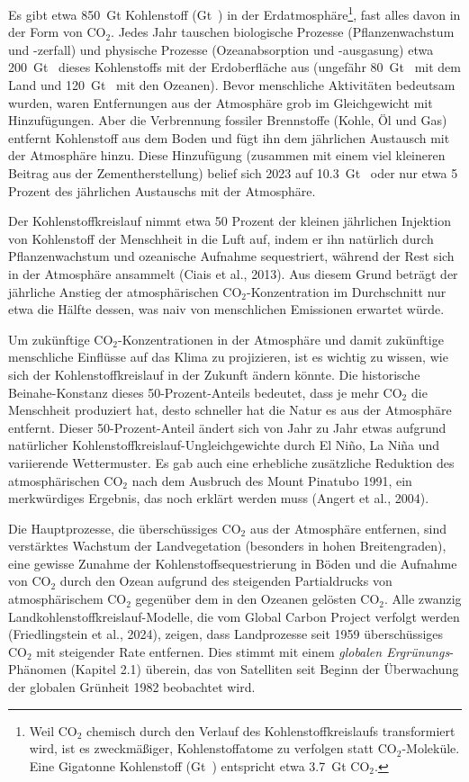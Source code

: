 \documentclass[12pt,paper=a4,DIV=12,parskip=never,chapterprefix=false,headings=standardclasses]{scrreprt}
\begin{document}
Es gibt etwa \SI{850}{\giga\tonne} Kohlenstoff (\si{\giga\tonne{}}) in der Erdatmosphäre\footnote{Weil CO$_2$ chemisch durch den Verlauf des Kohlenstoffkreislaufs transformiert wird, ist es zweckmäßiger, Kohlenstoffatome zu verfolgen statt CO$_2$-Moleküle. Eine Gigatonne Kohlenstoff (\si{\giga\tonne{}}) entspricht etwa \SI{3.7}{\giga\tonne} CO$_2$.}, fast alles davon in der Form von CO$_2$. Jedes Jahr tauschen biologische Prozesse (Pflanzenwachstum und -zerfall) und physische Prozesse (Ozeanabsorption und -ausgasung) etwa \SI{200}{\giga\tonne{}} dieses Kohlenstoffs mit der Erdoberfläche aus (ungefähr \SI{80}{\giga\tonne{}} mit dem Land und \SI{120}{\giga\tonne{}} mit den Ozeanen). Bevor menschliche Aktivitäten bedeutsam wurden, waren Entfernungen aus der Atmosphäre grob im Gleichgewicht mit Hinzufügungen. Aber die Verbrennung fossiler Brennstoffe (Kohle, Öl und Gas) entfernt Kohlenstoff aus dem Boden und fügt ihn dem jährlichen Austausch mit der Atmosphäre hinzu. Diese Hinzufügung (zusammen mit einem viel kleineren Beitrag aus der Zementherstellung) belief sich 2023 auf \SI{10.3}{\giga\tonne{}} oder nur etwa 5 Prozent des jährlichen Austauschs mit der Atmosphäre.

Der Kohlenstoffkreislauf nimmt etwa 50 Prozent der kleinen jährlichen Injektion von Kohlenstoff der Menschheit in die Luft auf, indem er ihn natürlich durch Pflanzenwachstum und ozeanische Aufnahme sequestriert, während der Rest sich in der Atmosphäre ansammelt (Ciais et al., 2013). Aus diesem Grund beträgt der jährliche Anstieg der atmosphärischen CO$_2$-Konzentration im Durchschnitt nur etwa die Hälfte dessen, was naiv von menschlichen Emissionen erwartet würde.

Um zukünftige CO$_2$-Konzentrationen in der Atmosphäre und damit zukünftige menschliche Einflüsse auf das Klima zu projizieren, ist es wichtig zu wissen, wie sich der Kohlenstoffkreislauf in der Zukunft ändern könnte. Die historische Beinahe-Konstanz dieses 50-Prozent-Anteils bedeutet, dass je mehr CO$_2$ die Menschheit produziert hat, desto schneller hat die Natur es aus der Atmosphäre entfernt. Dieser 50-Prozent-Anteil ändert sich von Jahr zu Jahr etwas aufgrund natürlicher Kohlenstoffkreislauf-Ungleichgewichte durch El Ni\~no, La Ni\~na und variierende Wettermuster. Es gab auch eine erhebliche zusätzliche Reduktion des atmosphärischen CO$_2$ nach dem Ausbruch des Mount Pinatubo 1991, ein merkwürdiges Ergebnis, das noch erklärt werden muss (Angert et al., 2004).

Die Hauptprozesse, die überschüssiges CO$_2$ aus der Atmosphäre entfernen, sind verstärktes Wachstum der Landvegetation (besonders in hohen Breitengraden), eine gewisse Zunahme der Kohlenstoffsequestrierung in Böden und die Aufnahme von CO$_2$ durch den Ozean aufgrund des steigenden Partialdrucks von atmosphärischem CO$_2$ gegenüber dem in den Ozeanen gelösten CO$_2$. Alle zwanzig Landkohlenstoffkreislauf-Modelle, die vom Global Carbon Project verfolgt werden (Friedlingstein et al., 2024), zeigen, dass Landprozesse seit 1959 überschüssiges CO$_2$ mit steigender Rate entfernen. Dies stimmt mit einem \emph{globalen Ergrünungs}-Phänomen (Kapitel 2.1) überein, das von Satelliten seit Beginn der Überwachung der globalen Grünheit 1982 beobachtet wird.
\end{document}
